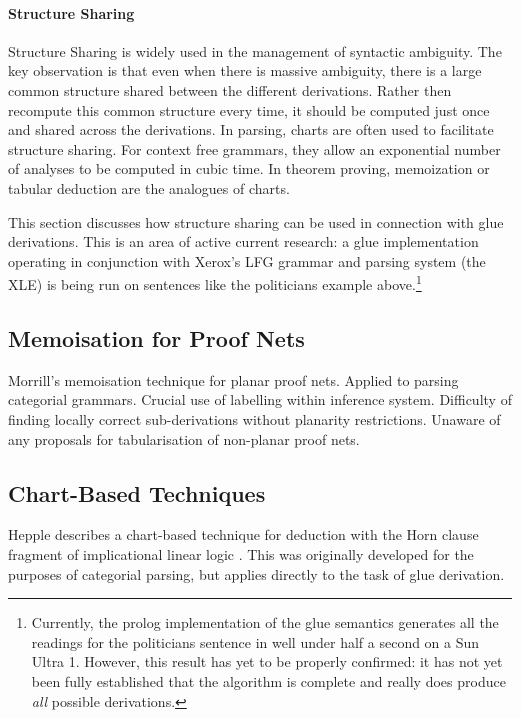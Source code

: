 \paragraph{Structure Sharing}
Structure Sharing is widely used in the management of syntactic ambiguity.  
The
key observation is that even when there is massive ambiguity, there is
a large common structure shared between the different derivations.  Rather
then recompute this common structure every time, it should be computed
just once and shared across the derivations.  In parsing, charts are often
used to facilitate structure sharing.  For context free grammars, they
allow an exponential number of analyses to be computed in cubic time.
In theorem proving, memoization or tabular deduction are the analogues
of charts.

\bigskip

This section discusses how structure sharing can be used in connection
with glue derivations.  This is an area of active current research:
a glue implementation operating in conjunction with Xerox's LFG grammar
and parsing system (the XLE) is being run on sentences like the politicians
example above.\footnote{Currently, the prolog implementation of the glue
semantics generates all the readings for the politicians sentence in well 
under
half a second on a Sun Ultra 1.  However, this result has yet to be 
properly confirmed: it has not yet been fully established that the algorithm
is complete and really does produce {\em all} possible derivations.}  


\subsection{Memoisation for Proof Nets}

Morrill's memoisation technique for planar proof nets. 
Applied to parsing categorial grammars. 
Crucial use of labelling within inference system.
Difficulty of
finding locally correct sub-derivations without planarity
restrictions. Unaware of any proposals for tabularisation of
non-planar proof nets.

\subsection{Chart-Based Techniques}

Hepple describes a chart-based technique for deduction with the
Horn clause fragment of implicational linear logic .
This was originally developed for the purposes of categorial parsing,
but applies directly to the task of glue derivation.

